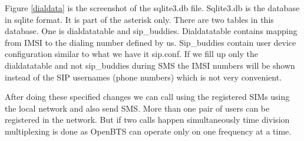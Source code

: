 Figure \ref{dialdata} is the screenshot of the sqlite3.db file. Sqlite3.db is 
the database in sqlite format. It is part of the asterisk only. There are two
tables in this database. One is dialdatatable and sip\_buddies. 
Dialdatatable contains mapping from IMSI  to the dialing number defined by us.
Sip\_buddies contain user device configuration similar to what we have it 
sip.conf. If we fill up only the dialdatatable and not sip\_buddies during SMS
the IMSI numbers will be shown instead of the SIP usernames (phone numbers)
which is not very convenient.

After doing these specified changes we can call using the registered SIMs
using the local network and also send SMS. More than one pair of users can be
registered in the network. But if two calls happen simultaneously time
division multiplexing is done as OpenBTS can operate only on one frequency
at a time. 

